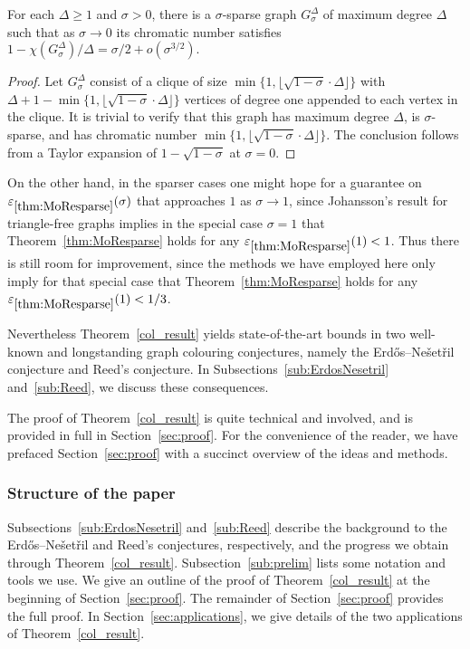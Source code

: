 \begin{proposition}\label{prop:sharp}
For each $\Delta\ge 1$ and  $\sigma>0$, there is a $\sigma$-sparse graph $G^\Delta_\sigma$ of maximum degree $\Delta$ such that as $\sigma\to0$ its chromatic number satisfies
\(
1-\chi(G^\Delta_\sigma)/\Delta = \sigma/2+o(\sigma^{3/2}).
\)
\end{proposition}
\begin{proof}
Let $G^\Delta_\sigma$ consist of a clique of size $\min\{1,\lfloor\sqrt{1-\sigma}\cdot\Delta\rfloor\}$ with $\Delta+1-\min\{1,\lfloor\sqrt{1-\sigma}\cdot\Delta\rfloor\}$ vertices of degree one appended to each vertex in the clique. It is trivial to verify that this graph has maximum degree $\Delta$, is $\sigma$-sparse, and has chromatic number $\min\{1,\lfloor\sqrt{1-\sigma}\cdot\Delta\rfloor\}$. The conclusion follows from a Taylor expansion of $1-\sqrt{1-\sigma}$ at $\sigma=0$.
\end{proof}

\noindent
On the other hand, in the sparser cases one might hope for a guarantee on $\varepsilon_{\ref{thm:MoResparse}}(\sigma)$ that approaches $1$ as $\sigma\to1$, since Johansson's result for triangle-free graphs implies in the special case $\sigma=1$ that Theorem~\ref{thm:MoResparse} holds for any $\varepsilon_{\ref{thm:MoResparse}}(1) < 1$. Thus there is still room for improvement, since the methods we have employed here only imply for that special case that Theorem~\ref{thm:MoResparse} holds for any $\varepsilon_{\ref{thm:MoResparse}}(1) < 1/3$.

Nevertheless Theorem~\ref{col_result} yields state-of-the-art bounds in two well-known and longstanding graph colouring conjectures, namely the Erd\H{o}s--Ne\v{s}et\v{r}il conjecture and Reed's conjecture.
In Subsections~\ref{sub:ErdosNesetril} and~\ref{sub:Reed}, we discuss these consequences.

The proof of Theorem~\ref{col_result} is quite technical and involved, and is provided in full in Section~\ref{sec:proof}.
For the convenience of the reader, we have prefaced Section~\ref{sec:proof} with a succinct overview of the ideas and methods.

\subsubsection*{Structure of the paper}

Subsections~\ref{sub:ErdosNesetril} and~\ref{sub:Reed} describe the background to the Erd\H{o}s--Ne\v{s}et\v{r}il and Reed's conjectures, respectively, and the progress we obtain through Theorem~\ref{col_result}.
Subsection~\ref{sub:prelim} lists some notation and tools we use.
We give an outline of the proof of Theorem~\ref{col_result} at the beginning of Section~\ref{sec:proof}.
The remainder of Section~\ref{sec:proof} provides the full proof.
In Section~\ref{sec:applications}, we give details of the two applications of Theorem~\ref{col_result}.


